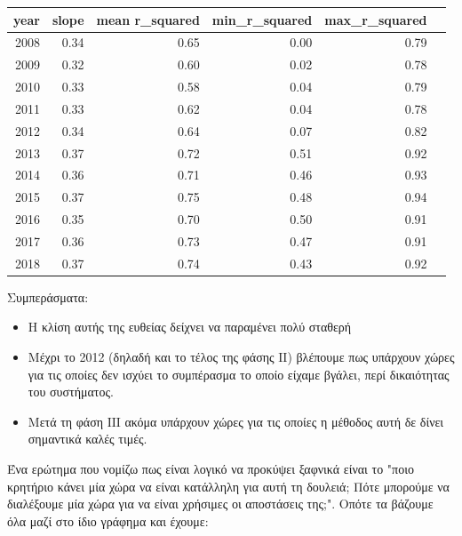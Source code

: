 \documentclass[a4paper,twoside,10pt]{article}
\begin{document}
	\begin{table}[ht]
		\centering
		\begin{tabular}{r|rrrrr}
			\hline
			year & slope & mean r\_squared & min\_r\_squared & max\_r\_squared \\
			\hline
			2008 & 0.34 & 0.65 & 0.00 & 0.79 \\
			2009 & 0.32 & 0.60 & 0.02 & 0.78 \\
			2010 & 0.33 & 0.58 & 0.04 & 0.79 \\
			2011 & 0.33 & 0.62 & 0.04 & 0.78 \\
			2012 & 0.34 & 0.64 & 0.07 & 0.82 \\
			2013 & 0.37 & 0.72 & 0.51 & 0.92 \\
			2014 & 0.36 & 0.71 & 0.46 & 0.93 \\
			2015 & 0.37 & 0.75 & 0.48 & 0.94 \\
			2016 & 0.35 & 0.70 & 0.50 & 0.91 \\
			2017 & 0.36 & 0.73 & 0.47 & 0.91 \\
			2018 & 0.37 & 0.74 & 0.43 & 0.92 \\
			\hline
		\end{tabular}
	\end{table}
	Συμπεράσματα:
	\begin{itemize}
		\item Η κλίση αυτής της ευθείας δείχνει να παραμένει πολύ σταθερή
		\item Μέχρι το 2012 (δηλαδή και το τέλος της φάσης ΙΙ) βλέπουμε πως υπάρχουν χώρες για τις οποίες δεν ισχύει το συμπέρασμα το οποίο είχαμε βγάλει, περί δικαιότητας του συστήματος.
		\item Μετά τη φάση ΙΙΙ ακόμα υπάρχουν χώρες για τις οποίες η μέθοδος αυτή δε δίνει σημαντικά καλές τιμές. 
	\end{itemize}
	\newpage
	
	Ένα ερώτημα που νομίζω πως είναι λογικό να προκύψει ξαφνικά είναι το "ποιο κρητήριο κάνει μία χώρα να είναι κατάλληλη για αυτή τη δουλειά; Πότε μπορούμε να διαλέξουμε μία χώρα για να είναι χρήσιμες οι αποστάσεις της;". Οπότε τα βάζουμε όλα μαζί στο ίδιο γράφημα και έχουμε:
	
\end{document}
